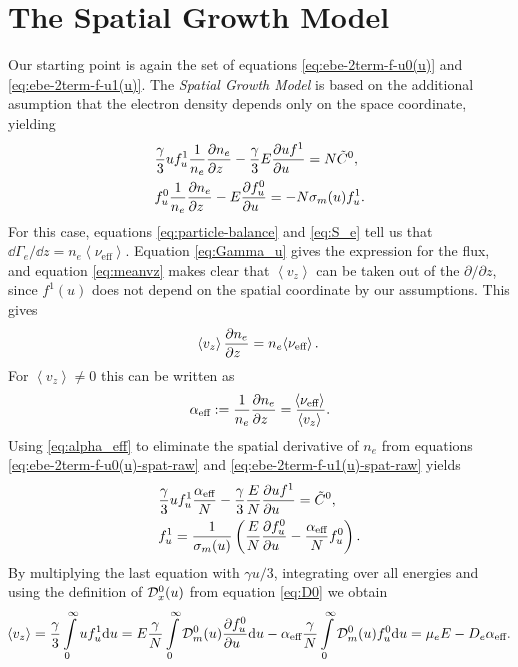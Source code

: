 \documentclass{book}
\newcommand{\MEAN}[1]{\ensuremath{\!\left\langle{{#1}}\right\rangle}}
\begin{document}
\section{The Spatial Growth Model}
\label{sec:theory:spat-growth}

Our starting point is again the set of equations \eqref{eq:ebe-2term-f-u0(u)}
and \eqref{eq:ebe-2term-f-u1(u)}. The {\em Spatial Growth Model} is based on the
additional asumption that the electron density depends only on the space
coordinate, yielding
\begin{align}
	&
	  \frac{\gamma}{3}uf^1_u\frac{1}{n_e}\PDEV{n_e}{z}
	- \frac{\gamma}{3}E\PDEV{u f^1}{u}
	= N\tilde{C}^0,
	\label{eq:ebe-2term-f-u0(u)-spat-raw}
	\\
	&
	  f^0_u\frac{1}{n_e}\PDEV{n_e}{z}
	- E\PDEV{f^0_u}{u}
	= -N\sigma_m(u)f^1_u.
	\label{eq:ebe-2term-f-u1(u)-spat-raw}
\end{align}
For this case, equations \eqref{eq:particle-balance} and \eqref{eq:S_e}
tell us that $\dd{\Gamma_e}/\dd{z}=n_e\MEAN{\nu_{\text{eff}}}$. Equation \eqref{eq:Gamma_u}
gives the expression for the flux, and equation \eqref{eq:meanvz} makes clear that
$\MEAN{v_z}$ can be taken out of the $\partial/\partial z$, since $f^1(u)$ does not depend
on the spatial coordinate by our assumptions. This gives
\begin{equation}
	\MEAN{v_z}\PDEV{n_e}{z}=n_e\MEAN{\nu_{\text{eff}}}.
\end{equation}
For $\MEAN{v_z}\neq 0$ this can be written as
\begin{equation}
	\alpha_{\text{eff}} := \frac{1}{n_e}\PDEV{n_e}{z}=\frac{\MEAN{\nu_{\text{eff}}}}{\MEAN{v_z}}.
	\label{eq:alpha_eff}
\end{equation}
Using \eqref{eq:alpha_eff} to eliminate the spatial derivative of $n_e$ from equations
\eqref{eq:ebe-2term-f-u0(u)-spat-raw} and \eqref{eq:ebe-2term-f-u1(u)-spat-raw} yields
\begin{align}
	&
	  \frac{\gamma}{3}uf^1_u\frac{\alpha_{\text{eff}}}{N}
	- \frac{\gamma}{3}\frac{E}{N}\PDEV{u f^1}{u}
	= \tilde{C}^0,
	\label{eq:ebe-2term-f-u0(u)-spat}
	\\
	&
	f^1_u =
	\frac{1}{\sigma_m(u)}\left(\frac{E}{N}\PDEV{f^0_u}{u}
	- \frac{\alpha_{\text{eff}}}{N}f^0_u\right).
	\label{eq:ebe-2term-f-u1(u)-spat}
\end{align}
By multiplying the last equation with $\gamma u/3$, integrating over all energies and
using the definition of ${\cal D}_x^0(u)$ from equation \eqref{eq:D0} we obtain
\begin{equation}
	\MEAN{v_z} = \frac{\gamma}{3}\int\limits_0^\infty uf^1_u\dd{u}
	=
		  E           \frac{\gamma}{N}\int\limits_0^\infty {\cal D}_m^0(u)\PDEV{f^0_u}{u}\dd{u}
		- \alpha_{\text{eff}}\frac{\gamma}{N}\int\limits_0^\infty {\cal D}_m^0(u)f^0_u\dd{u}
	= \mu_e E - D_e\alpha_{\text{eff}}.
	\label{eq:ebe-2term-f-u1(u)-spat-v_z}
\end{equation}
\end{document}
